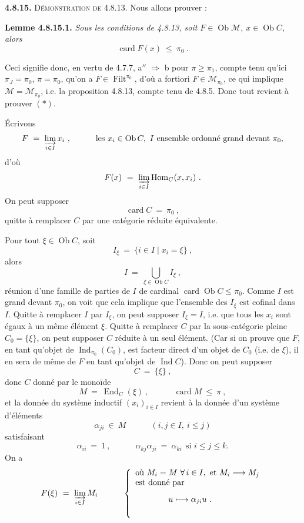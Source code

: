 \documentclass[11pt]{article}
\newcommand{\printedpage}[1]{\marginpar{\footnotesize p.~#1}}
\newcommand{\msp}[1]{\marginpar{\footnotesize [#1]}}
\newcommand{\Ind}{\operatorname{Ind}}
\newcommand{\Filt}{\operatorname{Filt}}
\newcommand{\card}{\operatorname{card}}
\newcommand{\Ob}{\operatorname{Ob}}
\newcommand{\Hom}{\operatorname{Hom}}
\newcommand{\End}{\operatorname{End}}
\newcommand{\cM}{\mathcal{M}}
\begin{document}
\msp{page 214}

\textbf{4.8.15.} \textsc{Démonstration de} 4.8.13. Nous allons prouver :

\textbf{Lemme 4.8.15.1.} \textit{Sous les conditions de 4.8.13, soit $F \in \Ob\cM$, $x \in \Ob C$, alors}
\[
\card F(x) \ \leqslant\ \pi_0\ . \tag*{$(*)$}
\]

Ceci signifie donc, en vertu de 4.7.7, a$''$ $\Longrightarrow$ b pour $\pi \geqslant \pi_1$, compte tenu qu'ici $\pi_J = \pi_0$, $\pi = \pi_0$, qu'on a $F \in \Filt^{\pi_0}$, d'où a fortiori $F \in \cM_{\pi_0}$, ce qui implique $\cM = \cM_{\pi_0}$, i.e. la proposition 4.8.13, compte tenu de 4.8.5. Donc tout revient à prouver $(*)$.

Écrivons
\[
F \ = \ \varinjlim_{i\in I} x_i\ , \qquad\quad \text{les } x_i \in \Ob C,\ I \text{ ensemble ordonné grand devant } \pi_0,
\]
d'où
\[
F(x) \ = \ \varinjlim_{i\in I} \Hom_C(x, x_i)\ .
\]
On peut supposer
\[
\card C \ = \ \pi_0\ ,
\]
quitte à remplacer $C$ par une catégorie réduite équivalente.

Pour tout $\xi \in \Ob C$, soit
\[
I_{\xi} \ = \ \{ i \in I \mid x_i = \xi \}\ ,
\]
alors
\[
I \ = \ \bigcup_{\xi\in\Ob C} I_{\xi}\ ,
\]
\msp{page 215}
réunion d'une famille de parties de $I$ de cardinal $\card\Ob C \leqslant \pi_0$. Comme $I$ est grand devant $\pi_0$, on voit que cela implique que l'ensemble des $I_{\xi}$ est cofinal dans $I$. Quitte à remplacer $I$ par $I_{\xi}$, on peut supposer $I_{\xi} = I$, i.e. que tous les $x_i$ sont égaux à un même élément $\xi$. Quitte à remplacer $C$ par la sous-catégorie pleine $C_0 = \{\xi\}$, on peut supposer $C$ réduite à un seul élément. (Car si on prouve que $F$, en tant qu'objet de $\Ind_{\pi_0}(C_0)$, est facteur direct d'un objet de $C_0$ (i.e. de $\xi$), il en sera de même de $F$ en tant qu'objet de $\Ind C$). Donc on peut supposer
\[
C \ = \ \{\xi\}\ ,
\]
donc $C$ donné par le monoïde
\[
M \ = \ \End_C(\xi)\ , \qquad\quad \card M \ \leqslant\ \pi\ ,
\]
et la donnée du système inductif $(x_i)_{i\in I}$ revient à la donnée d'un système d'éléments
\[
\alpha_{ji} \ \in\ M \qquad\quad (i, j \in I,\ i \leqslant j)
\]
\printedpage{77}
satisfaisant
\[
\alpha_{ii} \ = \ 1\ , \qquad\quad \alpha_{kj}\alpha_{ji} \ = \ \alpha_{ki} \ \ \text{si } i \leqslant j \leqslant k.
\]
On a
\[
F(\xi) \ = \ \varinjlim_{i\in I} M_i \qquad\quad
\left\{
\begin{array}{l}
\text{où } M_i = M \ \forall\, i \in I, \text{ et } M_i \longrightarrow M_j \\
\text{est donné par} \\[2ex]
\qquad\qquad u \longmapsto \alpha_{ji}u\ . \\[4ex]
\end{array}
\right.
\]
\end{document}
